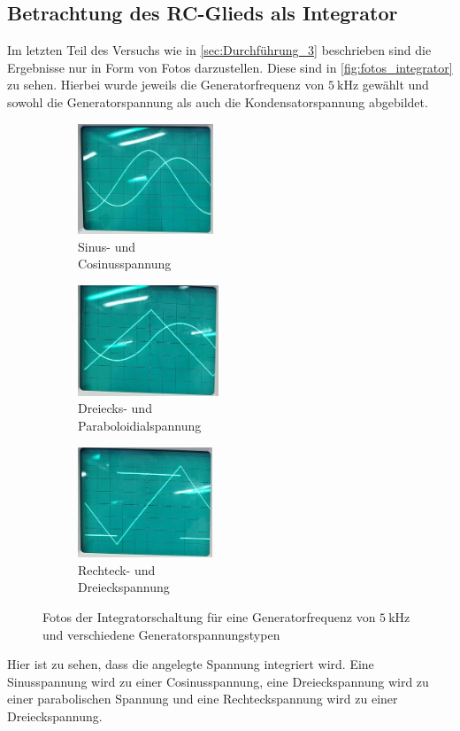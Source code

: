 \subsection{Betrachtung des RC-Glieds als Integrator}
\label{sec:Auswertung_Integrator}

Im letzten Teil des Versuchs wie in \autoref{sec:Durchführung_3} beschrieben sind die Ergebnisse nur in Form von Fotos darzustellen. Diese sind in \autoref{fig:fotos_integrator} zu sehen. Hierbei wurde jeweils die Generatorfrequenz von $\SI{5}{\kilo\hertz}$ gewählt und sowohl die Generatorspannung als auch die Kondensatorspannung abgebildet.

\begin{figure}
    \centering
    \begin{subfigure}{0.3\textwidth}
        \centering
        \includegraphics[height=3.3cm]{images/foto_03_ausschnitt.jpg}
        \caption{Sinus- und \\ Cosinusspannung}
        \label{fig:foto_sin_integrator}
    \end{subfigure}
    \begin{subfigure}{0.3\textwidth}
        \centering
        \includegraphics[height=3.3cm]{images/foto_04_ausschnitt.jpg}
        \caption{Dreiecks- und \\ Paraboloidialspannung}
        \label{fig:foto_saege_integrator}
    \end{subfigure}
    \begin{subfigure}{0.3\textwidth}
        \centering
        \includegraphics[height=3.3cm]{images/foto_05_ausschnitt.jpg}
        \caption{Rechteck- und \\ Dreieckspannung}
        \label{fig:foto_rechteck_integrator}
    \end{subfigure}
    \caption{Fotos der Integratorschaltung für eine Generatorfrequenz von $\SI{5}{\kilo\hertz}$ und verschiedene Generatorspannungstypen}
    \label{fig:fotos_integrator}
\end{figure}

Hier ist zu sehen, dass die angelegte Spannung integriert wird. Eine Sinusspannung wird zu einer Cosinusspannung, eine Dreieckspannung wird zu einer parabolischen Spannung und eine Rechteckspannung wird zu einer Dreieckspannung.
